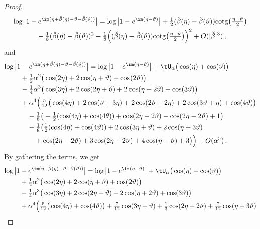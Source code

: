 \documentclass[a4paper,reqno,10pt]{article}
\begin{document}
\begin{proof}
	\begin{align}
		\log\big| 1&-e^{\im(\eta +\breve{\beta}(\eta)-\vartheta-\breve{\beta}(\vartheta))} \big|  =  \log \big| 1- e^{\im(\eta-\vartheta)} \big| +\tfrac12 (\breve{\beta}(\eta)-\breve{\beta}(\vartheta)) {\rm cotg} \big( \tfrac{\eta-\vartheta}{2}\big) \\
		&	\quad -\tfrac18 (\breve{\beta}(\eta)-\breve{\beta}(\vartheta))^2 - \tfrac18 \Big( (\breve{\beta}(\eta)-\breve{\beta}(\vartheta)) {\rm cotg} \big( \tfrac{\eta-\vartheta}{2}\big)  \Big)^2 + O(|\breve{\beta}|^3) \,, \end{align}
			and
		\begin{align}
		\log\big| 1&-e^{\im(\eta +\breve{\beta}(\eta)-\vartheta-\breve{\beta}(\vartheta))} \big| 
		= \log \big| 1- e^{\im(\eta-\vartheta)} \big|  + \tU_{\alpha} \big( \cos(\eta)+\cos(\vartheta) \big) \\
		& + \tfrac12\alpha^2 \big(  \cos(2\eta)+2 \cos(\eta+\vartheta)+\cos(2\vartheta) \big) \\
		& -\tfrac14 \alpha^3 \big( \cos(3\eta) + 2 \cos(2\eta+\vartheta) + 2 \cos(\eta+2\vartheta)  + \cos(3\vartheta)  \big)  \\
		&+\alpha^4 \Big( \tfrac{5}{12}\big( \cos(4\eta) + 2 \cos(\vartheta+3\eta) + 2 \cos(2\vartheta+2\eta) + 2 \cos(3\vartheta + \eta) + \cos(4\vartheta) \big) \\
		& \quad -\tfrac18 \big( - \tfrac12(\cos(4\eta)+\cos(4\theta))  + \cos(2\eta+2\vartheta) - \cos(2\eta-2\vartheta) +1 \big) \\
		& \quad -\tfrac18 \big(   \tfrac12(\cos(4\eta)+\cos(4\vartheta)) +2  \cos(3\eta+\vartheta)		+2\cos(\eta+3\vartheta)  \\
		&\quad \quad + \cos(2\eta-2\vartheta) + 3\cos(2\eta+2\vartheta) + 4 \cos(\eta-\vartheta) + 3   \big) \Big) + O(\alpha^5) \,.	\end{align}
	By gathering the terms, we get
	\begin{align}
		\log\big| 1&-e^{\im(\eta +\breve{\beta}(\eta)-\vartheta-\breve{\beta}(\vartheta))} \big|  = \log \big| 1- e^{\im(\eta-\vartheta)} \big|+\tU_{\alpha} \big( \cos(\eta)+\cos(\vartheta) \big)\\
		& + \tfrac12\alpha^2 \big(  \cos(2\eta)+2 \cos(\eta+\vartheta)+\cos(2\vartheta) \big) \\
& -\tfrac14 \alpha^3 \big( \cos(3\eta) + 2 \cos(2\eta+\vartheta) + 2 \cos(\eta+2\vartheta)  + \cos(3\vartheta)  \big)  \\
&+\alpha^4 \Big( \tfrac{5}{12} \big(\cos(4\eta)+\cos(4\vartheta)\big)  + \tfrac{7}{12}\cos(3\eta+\vartheta)+\tfrac{1}{3}\cos(2\eta+2\vartheta)+\tfrac{7}{12}\cos(\eta+3\vartheta) \\

\end{align}
\end{proof}
\end{document}
